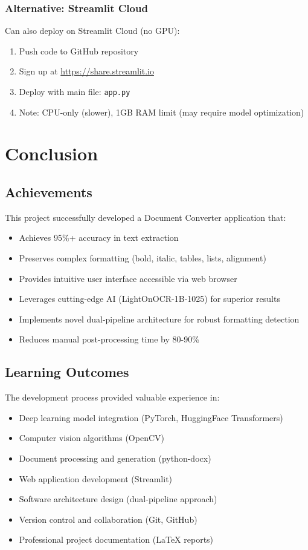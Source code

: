 \documentclass[12pt,a4paper]{article}
\begin{document}
\subsubsection{Alternative: Streamlit Cloud}
Can also deploy on Streamlit Cloud (no GPU):
\begin{enumerate}[noitemsep]
    \item Push code to GitHub repository
    \item Sign up at \url{https://share.streamlit.io}
    \item Deploy with main file: \texttt{app.py}
    \item Note: CPU-only (slower), 1GB RAM limit (may require model optimization)
\end{enumerate}

\newpage

\section{Conclusion}

\subsection{Achievements}
This project successfully developed a Document Converter application that:
\begin{itemize}[noitemsep]
    \item Achieves 95\%+ accuracy in text extraction
    \item Preserves complex formatting (bold, italic, tables, lists, alignment)
    \item Provides intuitive user interface accessible via web browser
    \item Leverages cutting-edge AI (LightOnOCR-1B-1025) for superior results
    \item Implements novel dual-pipeline architecture for robust formatting detection
    \item Reduces manual post-processing time by 80-90\%
\end{itemize}

\subsection{Learning Outcomes}
The development process provided valuable experience in:
\begin{itemize}[noitemsep]
    \item Deep learning model integration (PyTorch, HuggingFace Transformers)
    \item Computer vision algorithms (OpenCV)
    \item Document processing and generation (python-docx)
    \item Web application development (Streamlit)
    \item Software architecture design (dual-pipeline approach)
    \item Version control and collaboration (Git, GitHub)
    \item Professional project documentation (LaTeX reports)
\end{itemize}
\end{document}
